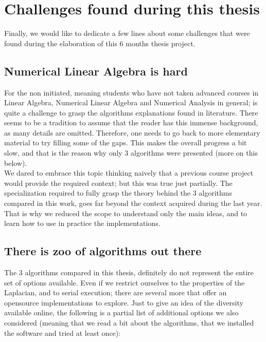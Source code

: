\section{Challenges found during this thesis}

Finally, we would like to dedicate a few lines about some challenges
that were found during the elaboration of this 6 months thesis
project.

\subsection{Numerical Linear Algebra is hard}

For the non initiated, meaning students who have not taken advanced
courses in Linear Algebra,  Numerical Linear Algebra and Numerical
Analysis in general; is quite a challenge to grasp the algorithms
explanations found in literature. There seems to be a tradition to
assume that the reader has this immense background, as many details
are omitted. Therefore, one needs to go back to more elementary
material to try filling some of the gaps. This makes the overall
progress a bit slow, and that is the reason why only 3 algorithms were
presented (more on this below). \\

We dared to embrace this topic thinking naively that a previous
course project would provide the required context; but this was
true just partially. The specialization required to fully grasp the
theory behind the 3 algorithms compared in this work, goes far beyond
the context acquired during the last year. That is why we reduced the
scope to understand only the main ideas, and to learn how to use in
practice the implementations.


\subsection{There is zoo of algorithms out there}

The 3 algorithms compared in this thesis, definitely do not represent
the entire set of options available. Even if we restrict ourselves to
the properties of the Laplacian, and to serial execution; there are
several more that offer an opensource implementations to
explore. Just to give an idea of the diversity available online, the
following is a partial list of additional options we also considered
(meaning that we read a bit about the algorithms, that we installed
the software and tried at least once):

